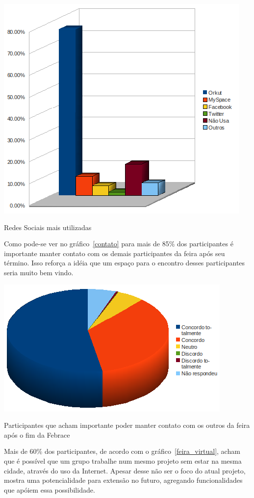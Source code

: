   \begin{grafico}
      \begin{center}
	\includegraphics[width=0.7\linewidth]{arquivos/rede_social.png}
      \end{center}
      \caption{Redes Sociais mais utilizadas}
      \label{rede_social}
  \end{grafico}

  Como pode-se ver no gráfico~\ref{contato} para mais de 85\% dos participantes é importante manter contato com os demais participantes da feira após 
seu término. Isso reforça a idéia que um espaço para o encontro desses participantes seria muito bem vindo.

  \begin{grafico}
      \begin{center}
	\includegraphics[width=0.7\linewidth]{arquivos/contato.png}
      \end{center}
      \caption{Participantes que acham importante poder manter contato com os outros da feira após o fim da Febrace}
      \label{contato}
  \end{grafico}

  Mais de 60\% dos participantes, de acordo com o gráfico~\ref{feira_virtual}, acham que é possível que um grupo trabalhe num mesmo projeto sem 
estar na mesma cidade, através do uso da Internet. Apesar desse não ser o foco do atual projeto, mostra uma potencialidade para extensão no futuro, 
agregando funcionalidades que apóiem essa possibilidade.

